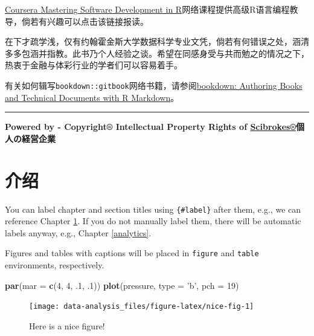 \documentclass[]{book}
\newenvironment{Shaded}{\begin{snugshade}}{\end{snugshade}}
\newcommand{\KeywordTok}[1]{\textcolor[rgb]{0.13,0.29,0.53}{\textbf{#1}}}
\newcommand{\DataTypeTok}[1]{\textcolor[rgb]{0.13,0.29,0.53}{#1}}
\newcommand{\DecValTok}[1]{\textcolor[rgb]{0.00,0.00,0.81}{#1}}
\newcommand{\StringTok}[1]{\textcolor[rgb]{0.31,0.60,0.02}{#1}}
\newcommand{\NormalTok}[1]{#1}
\begin{document}
\href{https://github.com/englianhu/coursera-mastering-software-development-in-r}{Coursera
Mastering Software Development in
R}网络课程提供高级R语言编程教导，倘若有兴趣可以点击该链接报读。

在下才疏学浅，仅有约翰霍金斯大学数据科学专业文凭，倘若有何错误之处，涵清多多包涵并指教。此书乃个人经验之谈。希望在同感身受与共而勉之的情况之下，热衷于金融与体彩行业的学者们可以容易着手。

有关如何辑写\texttt{bookdown::gitbook}网络书籍，请参阅\href{https://bookdown.org/yihui/bookdown/}{bookdown:
Authoring Books and Technical Documents with R Markdown}。

\begin{center}\rule{0.5\linewidth}{\linethickness}\end{center}

\textbf{Powered by - Copyright® Intellectual Property Rights of
\href{http://www.scibrokes.com}{Scibrokes®}個人の経営企業}

\chapter{介绍}\label{intro}

You can label chapter and section titles using \texttt{\{\#label\}}
after them, e.g., we can reference Chapter \ref{intro}. If you do not
manually label them, there will be automatic labels anyway, e.g.,
Chapter \ref{analytics}.

Figures and tables with captions will be placed in \texttt{figure} and
\texttt{table} environments, respectively.

\begin{Shaded}
\begin{Highlighting}[]
\KeywordTok{par}\NormalTok{(}\DataTypeTok{mar =} \KeywordTok{c}\NormalTok{(}\DecValTok{4}\NormalTok{, }\DecValTok{4}\NormalTok{, .}\DecValTok{1}\NormalTok{, .}\DecValTok{1}\NormalTok{))}
\KeywordTok{plot}\NormalTok{(pressure, }\DataTypeTok{type =} \StringTok{'b'}\NormalTok{, }\DataTypeTok{pch =} \DecValTok{19}\NormalTok{)}
\end{Highlighting}
\end{Shaded}

\begin{figure}

{\centering \texttt{[image: data-analysis\_files/figure-latex/nice-fig-1]} 

}

\caption{Here is a nice figure!}\label{fig:nice-fig}
\end{figure}
\end{document}
